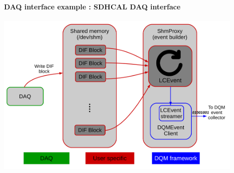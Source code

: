 \documentclass[8pt]{beamer}
\begin{document}
    \begin{frame}
      \frametitle{\secname}
      \framesubtitle{DAQ interface example : SDHCAL DAQ interface}
      \begin{center}
        \includegraphics[width=0.9\textwidth]{figs/sdhcal_dqm_daq.pdf}
      \end{center}
    \end{frame}

%
%
\end{document}
